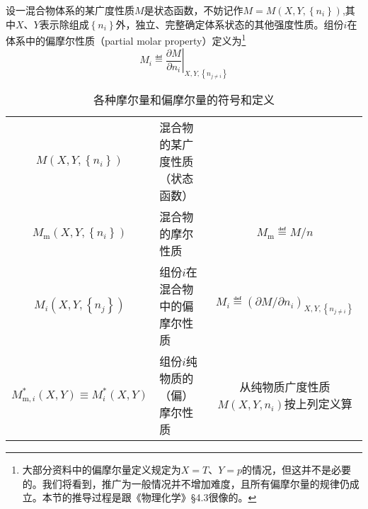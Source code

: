 \documentclass[main.tex]{subfiles}
\begin{document}
设一混合物体系的某广度性质$M$是状态函数，不妨记作$M=M\left(X,Y,\left\{n_i\right\}\right)$,其中$X$、$Y$表示除组成$\left\{n_i\right\}$外，独立、完整确定体系状态的其他强度性质。组份$i$在体系中的偏摩尔性质（partial molar property）定义为\footnote{大部分资料中的偏摩尔量定义规定为$X=T$、$Y=p$的情况，但这并不是必要的。我们将看到，推广为一般情况并不增加难度，且所有偏摩尔量的规律仍成立。本节的推导过程是跟《物理化学》\S4.3很像的。}
\[M_i\eqdef\left.\frac{\partial M}{\partial n_i}\right|_{X,Y,\left\{n_{j\neq i}\right\}}\]

\begin{longtable}{clc}
    \caption{各种摩尔量和偏摩尔量的符号和定义}                                                                                                                                           \\
    \hline
    $M\left(X,Y,\left\{n_i\right\}\right)$                         & 混合物的某广度性质（状态函数）  &                                                                                  \\
    $M_\text{m}\left(X,Y,\left\{n_i\right\}\right)$                & 混合物的摩尔性质         & $M_\text{m}\eqdef M/n$                                                           \\
    $M_i\left(X,Y,\left\{n_j\right\}\right)$                       & 组份$i$在混合物中的偏摩尔性质 & $M_i\eqdef\left(\partial M/\partial n_i\right)_{X,Y,\left\{n_{j\neq i}\right\}}$ \\
    $M_{\text{m},i}^*\left(X,Y\right)\equiv M_i^*\left(X,Y\right)$ & 组份$i$纯物质的（偏）摩尔性质 & 从纯物质广度性质$M\left(X,Y,n_i\right)$按上列定义算                                            \\
    \hline
\end{longtable}
\end{document}
